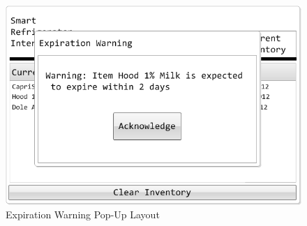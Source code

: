 \documentclass[11pt]{article} %
\begin{document}
\begin{figure}[h!]
\begin{center}
\includegraphics[scale=0.5]{../graphics/MockUp4}
\caption{Expiration Warning Pop-Up Layout}
\label{mock4}
\end{center}
\end{figure}
\pagebreak
\quad \newline
\end{document}
